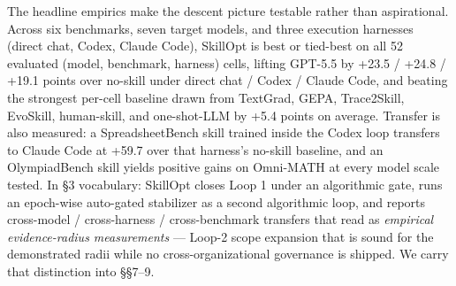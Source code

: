\documentclass[
]{article}
\begin{document}
The headline empirics make the descent picture testable rather than
aspirational. Across six benchmarks, seven target models, and three
execution harnesses (direct chat, Codex, Claude Code), SkillOpt is best
or tied-best on all 52 evaluated (model, benchmark, harness) cells,
lifting GPT-5.5 by +23.5 / +24.8 / +19.1 points over no-skill under
direct chat / Codex / Claude Code, and beating the strongest per-cell
baseline drawn from TextGrad, GEPA, Trace2Skill, EvoSkill, human-skill,
and one-shot-LLM by +5.4 points on average. Transfer is also measured: a
SpreadsheetBench skill trained inside the Codex loop transfers to Claude
Code at +59.7 over that harness's no-skill baseline, and an
OlympiadBench skill yields positive gains on Omni-MATH at every model
scale tested. In §3 vocabulary: SkillOpt closes Loop 1 under an
algorithmic gate, runs an epoch-wise auto-gated stabilizer as a second
algorithmic loop, and reports cross-model / cross-harness /
cross-benchmark transfers that read as \emph{empirical evidence-radius
measurements} --- Loop-2 scope expansion that is sound for the
demonstrated radii while no cross-organizational governance is shipped.
We carry that distinction into §§7--9.
\end{document}
